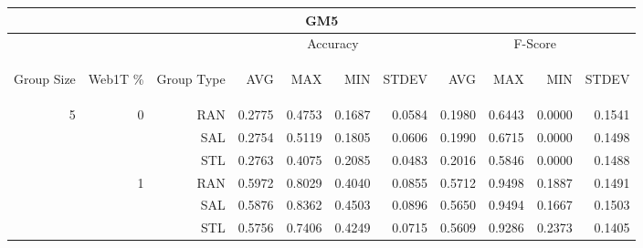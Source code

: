 \begin{center}
\begin{table}[htbp]
\begin{tabular}{ | r | r | r | r | r | r | r | r | r | r | r |}
\hline
\multicolumn{11}{|c|}{GM5}\\
\hline
 & & & \multicolumn{4}{|c|}{Accuracy} & \multicolumn{4}{|c|}{F-Score}\\ \cline{4-11}
\begin{sideways}Group Size\end{sideways} & \begin{sideways}Web1T \%\end{sideways} & \begin{sideways}Group Type\end{sideways} & \begin{sideways}AVG\end{sideways} & \begin{sideways}MAX\end{sideways} & \begin{sideways}MIN\end{sideways} & \begin{sideways}STDEV\end{sideways} & \begin{sideways}AVG\end{sideways} & \begin{sideways}MAX\end{sideways} & \begin{sideways}MIN\end{sideways} & \begin{sideways}STDEV\end{sideways}\\
\hline
\multirow{17}{*}{5}
 & \multirow{3}{*}{0} & RAN & 0.2775 & 0.4753 & 0.1687 & 0.0584 & 0.1980 & 0.6443 & 0.0000 & 0.1541\\ \cline{3-11}
 &   & SAL & 0.2754 & 0.5119 & 0.1805 & 0.0606 & 0.1990 & 0.6715 & 0.0000 & 0.1498\\ \cline{3-11}
 &   & STL & 0.2763 & 0.4075 & 0.2085 & 0.0483 & 0.2016 & 0.5846 & 0.0000 & 0.1488\\ \cline{2-11}
 & \multirow{3}{*}{1} & RAN & 0.5972 & 0.8029 & 0.4040 & 0.0855 & 0.5712 & 0.9498 & 0.1887 & 0.1491\\ \cline{3-11}
 &   & SAL & 0.5876 & 0.8362 & 0.4503 & 0.0896 & 0.5650 & 0.9494 & 0.1667 & 0.1503\\ \cline{3-11}
 &   & STL & 0.5756 & 0.7406 & 0.4249 & 0.0715 & 0.5609 & 0.9286 & 0.2373 & 0.1405\\ \cline{2-11}

\end{tabular}
\end{table}
\end{center}
